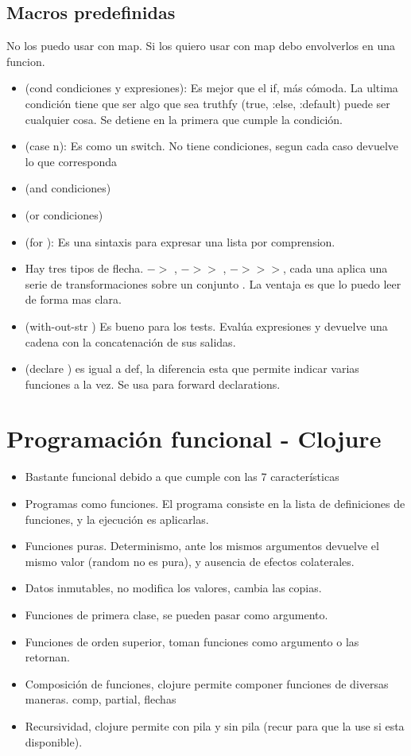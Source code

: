 \subsection*{Macros predefinidas}

No los puedo usar con map. Si los quiero usar con map debo envolverlos en una funcion.
\begin{itemize}
    \item (cond condiciones y expresiones): Es mejor que el if, más cómoda. La ultima condición tiene que ser algo que sea truthfy (true, :else, :default) puede ser cualquier cosa. Se detiene en la primera que cumple la condición.
    \item (case n): Es como un switch. No tiene condiciones, segun cada caso devuelve lo que corresponda
    \item (and condiciones)
    \item (or condiciones)
    \item (for ): Es una sintaxis para expresar una lista por comprension.
    \item Hay tres tipos de flecha. $->$ , $->>$ , $->>>$, cada una aplica una serie de transformaciones sobre un conjunto . La ventaja es que lo puedo leer de forma mas clara.
    \item (with-out-str ) Es bueno para los tests. Evalúa expresiones y devuelve una cadena con la concatenación de sus salidas.
    \item (declare ) es igual a def, la diferencia esta que permite indicar varias funciones a la vez. Se usa para forward declarations.
\end{itemize}

\section*{Programación funcional - Clojure}


\begin{itemize}
\item Bastante funcional debido a que cumple con las 7 características
\item Programas como funciones. El programa consiste en la lista de definiciones de funciones, y la ejecución es aplicarlas.
\item Funciones puras. Determinismo, ante los mismos argumentos devuelve el mismo valor (random no es pura), y ausencia de efectos colaterales.
\item Datos inmutables, no modifica los valores, cambia las copias.
\item Funciones de primera clase, se pueden pasar como argumento.
\item Funciones de orden superior, toman funciones como argumento o las retornan.
\item Composición de funciones, clojure permite componer funciones de diversas maneras. comp, partial, flechas
\item Recursividad, clojure permite con pila y sin pila (recur para que la use si esta disponible).
\end{itemize}

